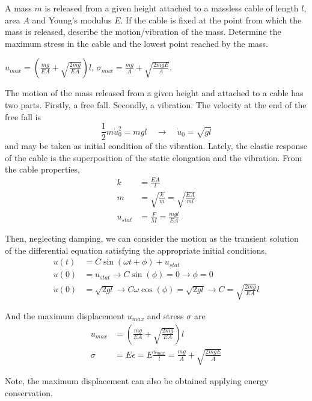 
\begin{Exercise}[label={mass_released}]
A mass $m$ is released from a given height attached to a massless cable of length $l$, area $A$ and Young's modulus $E$. If the cable is fixed at the point from which the mass is released, describe the motion/vibration of the mass. Determine the maximum stress in the cable and the lowest point reached by the mass.

\begin{center}
\end{center}

\shortAnswer $u_{max} = \left(\frac{mg}{EA} + \sqrt{\frac{2mg}{EA}}\right)l$, $\sigma_{max} = \frac{mg}{A} + \sqrt{\frac{2mgE}{A}}$.
\end{Exercise}



\begin{Answer}[ref={mass_released}]
The motion of the mass released from a given height and attached to a cable has two parts. Firstly, a free fall. Secondly, a vibration. The velocity at the end of the free fall is
$$
\frac{1}{2}m\dot{u}_0^2 = mgl \quad \rightarrow \quad \dot{u}_0 = \sqrt{gl}
$$
and may be taken as initial condition of the vibration. Lately, the elastic response of the cable is the superposition of the static elongation and the vibration. From the cable properties,
\begin{align*}
k &= \frac{EA}{l} \\
m &= \sqrt{\frac{k}{m}} = \sqrt{\frac{EA}{ml}} \\
u_{stat} &= \frac{F}{M} = \frac{mgl}{EA}
\end{align*}

Then, neglecting damping, we can consider the motion as the transient solution of the differential equation satisfying the appropriate initial conditions,
\begin{align*}
u(t) &= C\sin(\omega t + \phi) + u_{stat} \\
u(0) &= u_{stat} \rightarrow C\sin(\phi) = 0 \rightarrow \phi = 0 \\
\dot{u}(0) &= \sqrt{2gl} \rightarrow C\omega\cos(\phi) =  \sqrt{2gl} \rightarrow C = \sqrt{\frac{2mg}{EA}}l
\end{align*}

And the maximum displacement $u_{max}$ and stress $\sigma$ are
\begin{align*}
u_{max} &= \left(\frac{mg}{EA} + \sqrt{\frac{2mg}{EA}}\right)l \\
\sigma &= E\epsilon = E\frac{u_{max}}{l} = \frac{mg}{A} + \sqrt{\frac{2mgE}{A}}
\end{align*}

Note, the maximum displacement can also be obtained applying energy conservation.
\end{Answer}
